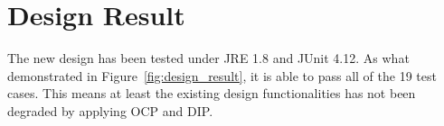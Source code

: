 \documentclass[conference]{IEEEtran}
\begin{document}
\section{Design Result}


The new design has been tested under JRE 1.8 and JUnit 4.12. As what demonstrated in Figure~\ref{fig:design_result}, it is able to pass all of the 19 test cases. This means at least the existing design functionalities has not been degraded by applying \gls{OCP} and \gls{DIP}. 


%
%



%
%
\end{document}

